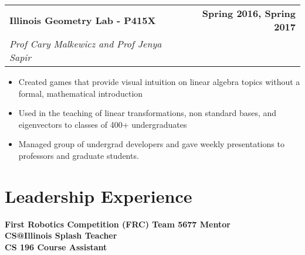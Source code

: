\documentclass[letterpaper]{article}
\newenvironment{details}
{\begin{itemize}}
{\end{itemize}}
\begin{document}
  \noindent
  \begin{tabularx}{\textwidth}{@{}X r@{}}
  \textbf{Illinois Geometry Lab - P415X} & \textbf{Spring 2016, Spring 2017} \\
  \textit{Prof Cary Malkewicz and Prof Jenya Sapir}
  \end{tabularx}
  \begin{details}
    \item Created games that provide visual intuition on linear algebra topics without a formal, mathematical introduction
    \item Used in the teaching of linear transformations, non standard bases, and eigenvectors to classes of 400+ undergraduates
    \item Managed group of undergrad developers and gave weekly presentations to professors and graduate students.
  \end{details}

  \section{Leadership Experience}
  \noindent
  \textbf{First Robotics Competition (FRC) Team 5677 Mentor} 
  \\\textbf{CS@Illinois Splash Teacher}  
  \\\textbf{CS 196 Course Assistant}
\end{document}
